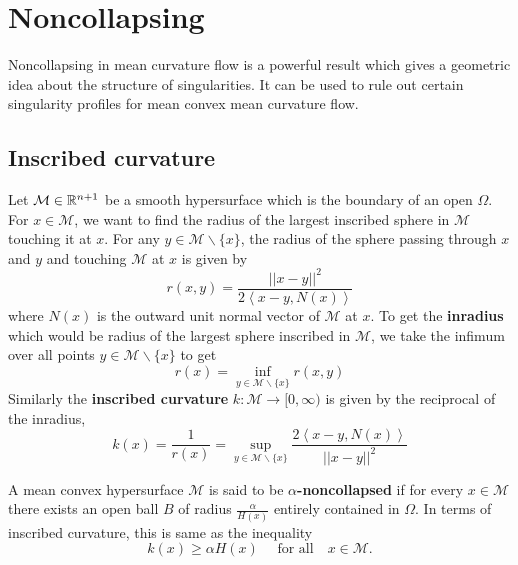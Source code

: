 \chapter{Noncollapsing}

Noncollapsing in mean curvature flow is a powerful result which gives a geometric idea about the structure of singularities. It can be used to rule out certain singularity profiles for mean convex mean curvature flow. 

\section{Inscribed curvature}

Let $ \mathcal{M} \in \mathbb{R}^{n+1} $ be a smooth hypersurface which is the boundary of an open $ \Omega $. For $ x \in \mathcal{M} $, we want to find the radius of the largest inscribed sphere in $ \mathcal{M} $ touching it at $ x $. For any $ y \in \mathcal{M}\backslash \{x\} $, the radius of the sphere passing through $ x $ and $ y $ and touching $ \mathcal{M} $ at $ x $ is given by \begin{equation}
    r(x,y) = \frac{||x-y||^{2}}{2\left< x-y,N(x) \right>}
\end{equation}
where $ N(x) $ is the outward unit normal vector of $ \mathcal{M} $ at $ x $. To get the \textbf{inradius} which would be radius of the largest sphere inscribed in $ \mathcal{M} $, we take the infimum over all points $ y \in \mathcal{M}\backslash \{x\} $ to get \begin{equation}
    r(x) = \inf_{{y \in \mathcal{M}\backslash \{x\}}} r(x,y)
\end{equation}
Similarly the \textbf{inscribed curvature} $ k : \mathcal{M} \to [0, \infty) $  is given by the reciprocal of the inradius, \begin{equation}
    k(x) = \frac{1}{r(x)} = \sup_{y \in \mathcal{M}\backslash \{x\}} \frac{2\left< x-y,N(x) \right>}{||x-y||^{2}}
\end{equation}

\begin{defn}
    A mean convex hypersurface $ \mathcal{M} $ is said to be \textbf{$ \alpha $-noncollapsed}   if for every $ x \in \mathcal{M} $ there exists an open ball $ B $ of radius $ \frac{\alpha}{H(x)} $ entirely contained in $ \Omega $. In terms of inscribed curvature, this is same as the inequality \begin{equation}
        k(x) \ge \alpha H(x) \quad \text{ for all} \quad x \in \mathcal{M}.
    \end{equation}
\end{defn}


